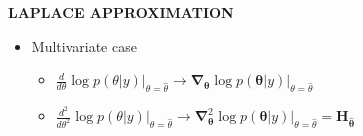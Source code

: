 \begin{whitebox}{\textbf{LAPLACE APPROXIMATION}}
\begin{itemize}
\begin{itemize}
\begin{enumerate}
\begin{align*}
                \end{align*}
                \item Normalize
                \begin{center}
                \end{center}
            \end{enumerate}
            \item Multivariate case
            \begin{itemize}
                \item $\frac{d}{d\theta}\log p(\theta| y)\bigr\rvert_{\theta=\hat{\theta}}\to\bm{\nabla}_{\bm{\theta}}\log p(\bm{\theta}|y)\bigr\rvert_{\theta=\hat{\theta}}$
                \item $\frac{d^2}{d\theta^2}\log p(\theta| y)\bigr\rvert_{\theta=\hat{\theta}}\to\bm{\nabla}^2_{\bm{\theta}}\log p(\bm{\theta}|y)\bigr\rvert_{\theta=\hat{\theta}}=\bm{H}_{\hat{\bm{\theta}}}$
            \end{itemize}
            \begin{center}
            \end{center}
            \begin{itemize}

\end{itemize}
\end{itemize}
\end{itemize}
\end{whitebox}
